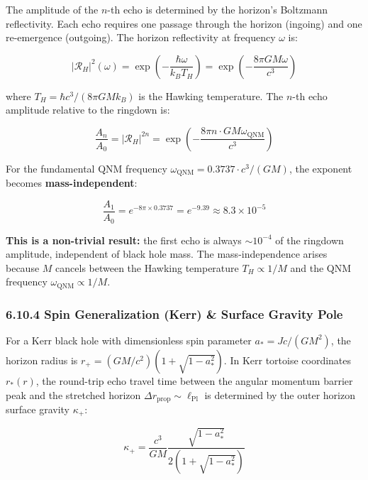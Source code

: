 \documentclass[11pt,a4paper]{article}
\theoremstyle{definition}
\theoremstyle{remark}
\begin{document}
The amplitude of the $n$-th echo is determined by the horizon's Boltzmann reflectivity. Each echo requires one passage through the horizon (ingoing) and one re-emergence (outgoing). The horizon reflectivity at frequency $\omega$ is:


\begin{equation}
|\mathcal{R}_H|^2(\omega) = \exp\!\left(-\frac{\hbar\omega}{k_B T_H}\right) = \exp\!\left(-\frac{8\pi G M \omega}{c^3}\right)
\end{equation}


where $T_H = \hbar c^3/(8\pi G M k_B)$ is the Hawking temperature. The $n$-th echo amplitude relative to the ringdown is:


\begin{equation}
\frac{A_n}{A_0} = |\mathcal{R}_H|^{2n} = \exp\!\left(-\frac{8\pi n \cdot G M \omega_{\text{QNM}}}{c^3}\right)
\end{equation}


For the fundamental QNM frequency $\omega_{\text{QNM}} = 0.3737 \cdot c^3/(GM)$, the exponent becomes \textbf{mass-independent}:


\begin{equation}
\frac{A_1}{A_0} = e^{-8\pi \times 0.3737} = e^{-9.39} \approx 8.3 \times 10^{-5}
\end{equation}


\textbf{This is a non-trivial result:} the first echo is always $\sim 10^{-4}$ of the ringdown amplitude, independent of black hole mass. The mass-independence arises because $M$ cancels between the Hawking temperature $T_H \propto 1/M$ and the QNM frequency $\omega_{\text{QNM}} \propto 1/M$.

\subsubsection{6.10.4 Spin Generalization (Kerr) \& Surface Gravity Pole}

For a Kerr black hole with dimensionless spin parameter $a_* = J c/(G M^2)$, the horizon radius is $r_+ = (GM/c^2)(1 + \sqrt{1 - a_*^2})$. In Kerr tortoise coordinates $r_*(r)$, the round-trip echo travel time between the angular momentum barrier peak and the stretched horizon $\Delta r_{\text{prop}} \sim \ell_{\text{Pl}}$ is determined by the outer horizon surface gravity $\kappa_+$:


\begin{equation}
\kappa_+ = \frac{c^3}{G M} \frac{\sqrt{1 - a_*^2}}{2(1 + \sqrt{1 - a_*^2})}
\end{equation}
\end{document}
